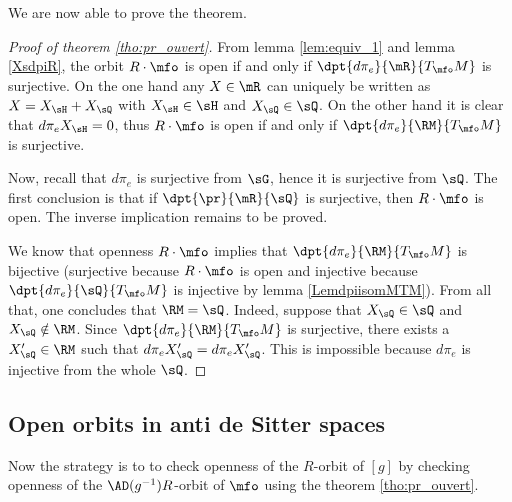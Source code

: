 We are now able to prove the theorem.

\begin{proof}[Proof of theorem \ref{tho:pr_ouvert}]
From lemma \ref{lem:equiv_1} and lemma \ref{XsdpiR}, the orbit $R\cdot\mfo$ is open if and only if $\dpt{d\pi_e}{\mR}{T_{\mfo}M}$ is surjective. On the one hand any $X\in\mR$ can uniquely be written as $X=X_{\sH}+X_{\sQ}$ with $X_{\sH}\in\sH$ and $X_{\sQ}\in\sQ$. On the other hand it is clear that $d\pi_e X_{\sH}=0$, thus $R\cdot\mfo$ is open if and only if $\dpt{d\pi_e}{\RM}{T_{\mfo}M}$ is surjective.

Now, recall that $d\pi_e$ is surjective from $\sG$, hence it is surjective from $\sQ$. The first conclusion is that if $\dpt{\pr}{\mR}{\sQ}$ is surjective, then $R\cdot\mfo$ is open. The inverse implication remains to be proved.

We know that openness $R\cdot\mfo$ implies that $\dpt{d\pi_e}{\RM}{T_{\mfo}M}$ is bijective (surjective because $R\cdot\mfo$ is open and injective because $\dpt{d\pi_e}{\sQ}{T_{\mfo}M}$ is injective by lemma \ref{LemdpiisomMTM}). From all that, one concludes that $\RM=\sQ$. Indeed,  suppose that $X_{\sQ}\in\sQ$ and $X_{\sQ}\notin\RM$. Since $\dpt{d\pi_e}{\RM}{T_{\mfo}M}$ is surjective, there exists a $X_{\sQ}'\in\RM$ such that $d\pi_eX_{\sQ}'=d\pi_eX_{\sQ}'$. This is impossible because $d\pi_e$ is injective from the whole $\sQ$.

\end{proof}

\subsection{Open orbits in anti de Sitter spaces}

Now the strategy is to to check openness of the $R$-orbit of $[g]$ by checking openness of the $\AD(g^{-1})R$-orbit of $\mfo$ using the theorem \ref{tho:pr_ouvert}.

